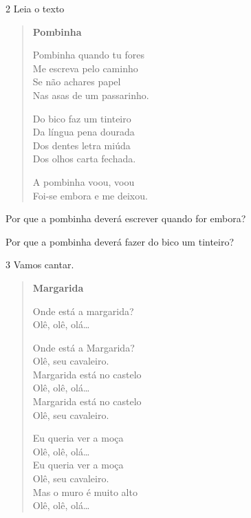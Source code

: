 \num{2} Leia o texto

\begin{myquote}
\begin{verse}
\textbf{Pombinha}

Pombinha quando tu fores\\
Me escreva pelo caminho\\
Se não achares papel\\
Nas asas de um passarinho.

Do bico faz um tinteiro\\
Da língua pena dourada\\
Dos dentes letra miúda\\
Dos olhos carta fechada.

A pombinha voou, voou\\
Foi-se embora e me deixou.
\end{verse}

\end{myquote}

\begin{escolha}
\item Por que a pombinha deverá escrever quando for embora?\\

\item Por que a pombinha deverá fazer do bico um tinteiro?\\

\end{escolha}

\num{3} Vamos cantar.


\begin{myquote}
\begin{verse}
\textbf{Margarida}

Onde está a margarida?\\
Olê, olê, olá…

Onde está a Margarida?\\
Olê, seu cavaleiro.\\
Margarida está no castelo\\
Olê, olê, olá…\\
Margarida está no castelo\\
Olê, seu cavaleiro.

Eu queria ver a moça\\
Olê, olê, olá…\\
Eu queria ver a moça\\
Olê, seu cavaleiro.\\
Mas o muro é muito alto\\
Olê, olê, olá…
\end{verse}

\end{myquote}

